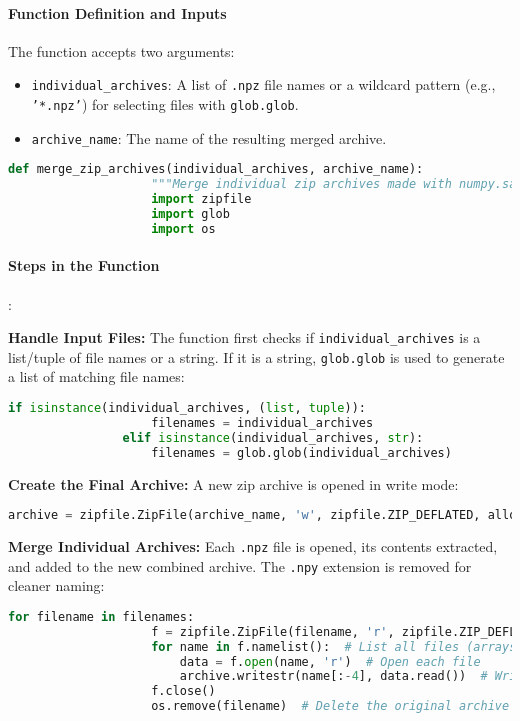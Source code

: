 \documentclass{article}
\begin{document}
			\paragraph{Function Definition and Inputs}
			The function accepts two arguments:
			\begin{itemize}
				\item \texttt{individual\_archives}: A list of \texttt{.npz} file names or a wildcard pattern (e.g., \texttt{'*.npz'}) for selecting files with \texttt{glob.glob}.
				\item \texttt{archive\_name}: The name of the resulting merged archive.
			\end{itemize}
			
			\begin{lstlisting}[language=Python]
				def merge_zip_archives(individual_archives, archive_name):
					"""Merge individual zip archives made with numpy.savez into one archive."""
					import zipfile
					import glob
					import os
			\end{lstlisting}
			
			
			
			\paragraph{Steps in the Function} :
			
			\textbf{Handle Input Files:} The function first checks if \texttt{individual\_archives} is a list/tuple of file names or a string. If it is a string, \texttt{glob.glob} is used to generate a list of matching file names:
			\begin{lstlisting}[language=Python]
				if isinstance(individual_archives, (list, tuple)):
					filenames = individual_archives
				elif isinstance(individual_archives, str):
					filenames = glob.glob(individual_archives)
			\end{lstlisting}
			
			\textbf{Create the Final Archive:} A new zip archive is opened in write mode:
			\begin{lstlisting}[language=Python]
				archive = zipfile.ZipFile(archive_name, 'w', zipfile.ZIP_DEFLATED, allowZip64=True)
			\end{lstlisting}
			
			\textbf{Merge Individual Archives:} Each \texttt{.npz} file is opened, its contents extracted, and added to the new combined archive. The \texttt{.npy} extension is removed for cleaner naming:
			\begin{lstlisting}[language=Python]
				for filename in filenames:
					f = zipfile.ZipFile(filename, 'r', zipfile.ZIP_DEFLATED)  # Open each archive
					for name in f.namelist():  # List all files (arrays) in the archive
						data = f.open(name, 'r')  # Open each file
						archive.writestr(name[:-4], data.read())  # Write to new archive (remove .npy)
					f.close()
					os.remove(filename)  # Delete the original archive
			\end{lstlisting}
			
\end{document}

